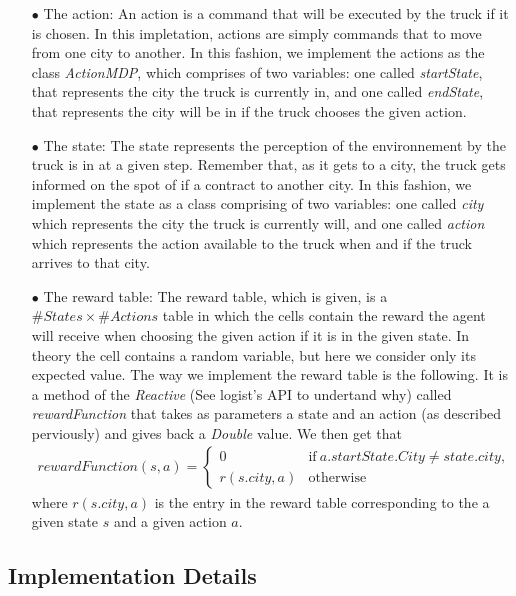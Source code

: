 \documentclass[11pt]{article}
\begin{document}
 	\begin{itemize}
 		\item[$\bullet$] The action: An action is a command that will be executed by the truck if it is chosen. In this impletation, actions are simply commands that to move from one city to another. In this fashion, we implement the actions as the class \emph{ActionMDP}, which comprises of two variables: one called \emph{startState}, that represents the city the truck is currently in, and one called \emph{endState}, that represents the city will be in if the truck chooses the given action.
 		
 		\item[$\bullet$] The state: The state represents the perception of the environnement by the truck is in at a given step. Remember that, as it gets to a city, the truck gets informed on the spot of if a contract to another city. In this fashion, we implement the state as a class comprising of two variables: one called \emph{city} which represents the city the truck is currently will, and one called \emph{action} which represents the action available to the truck when and if the truck arrives to that city.
 		
 		\item[$\bullet$] The reward table: The reward table, which is given, is a $\#States\times\#Actions$ table in which the cells contain the reward the agent will receive when choosing the given action if it is in the given state. In theory the cell contains a random variable, but here we consider only its expected value. The way we implement the reward table is the following. It is a method of the \emph{Reactive} (See logist's API to undertand why) called \emph{rewardFunction} that takes as parameters a state and an action (as described perviously) and gives back a \emph{Double} value. We then get that 
 			\begin{align*}
 				rewardFunction(s,a)= 
 					\begin{cases}
 						0 & \mathrm{if}\ a.startState.City\neq state.city,\\
 						r(s.city,a) & \mathrm{otherwise}
					\end{cases}
			\end{align*}
where $r(s.city,a)$ is the entry in the reward table corresponding to the a given state $s$ and a given action $a$.
 		
	\end{itemize}
\subsection{Implementation Details}
\end{document}
